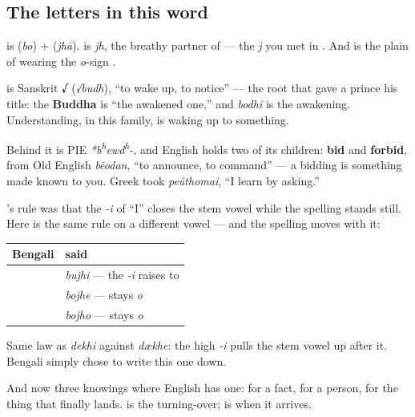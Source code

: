 \subsection*{The letters in this word}
\textbf{} is \textbf{} (\emph{bo}) + \textbf{} (\emph{jhā}). \textbf{} is \emph{jh}, the breathy partner of \textbf{} — the \emph{j} you met in . And \textbf{} is the plain \textbf{} of  wearing the \emph{o}-sign \textbf{}.

\begin{cousinweb}
\textbf{} is Sanskrit \textbf{√} (\emph{√budh}), \textquotedblleft{}to wake up, to notice\textquotedblright{} — the root that gave a prince his title: the \textbf{Buddha} is \textquotedblleft{}the awakened one,\textquotedblright{} and \emph{bodhi} is the awakening. Understanding, in this family, is waking up to something.

Behind it is PIE \emph{*b\textsuperscript{h}ewd\textsuperscript{h}-}, and English holds two of its children: \textbf{bid} and \textbf{forbid}, from Old English \emph{bēodan}, \textquotedblleft{}to announce, to command\textquotedblright{} — a bidding is something made known to you. Greek took \emph{peúthomai}, \textquotedblleft{}I learn by asking.\textquotedblright{}
\end{cousinweb}

\begin{grammarlens}[title={Grammar Lens: the harmony again, and this time you can see it}]
's rule was that the \emph{-i} of \textquotedblleft{}I\textquotedblright{} closes the stem vowel while the spelling stands still. Here is the same rule on a different vowel — and the spelling moves with it:

\noindent
\begin{tabularx}{\linewidth}{@{}>{\raggedright\arraybackslash}X>{\raggedright\arraybackslash}X@{}}
\toprule
\textbf{Bengali} & \textbf{said} \\
\midrule
\bn{আমি} \bn{বুঝি} & \emph{bujhi} — the \emph{-i} raises \textbf{\bn{ো}} to \textbf{\bn{ু}} \\
\bn{সে} \bn{বোঝে} & \emph{bojhe} — stays \emph{o} \\
\bn{তুমি} \bn{বোঝো} & \emph{bojho} — stays \emph{o} \\
\bottomrule
\end{tabularx}

Same law as \emph{dekhi} against \emph{dækhe}: the high \emph{-i} pulls the stem vowel up after it. Bengali simply chose to write this one down.

And now three knowings where English has one: \textbf{} for a fact, \textbf{} for a person, \textbf{} for the thing that finally lands.  is the turning-over;  is when it arrives.
\end{grammarlens}

